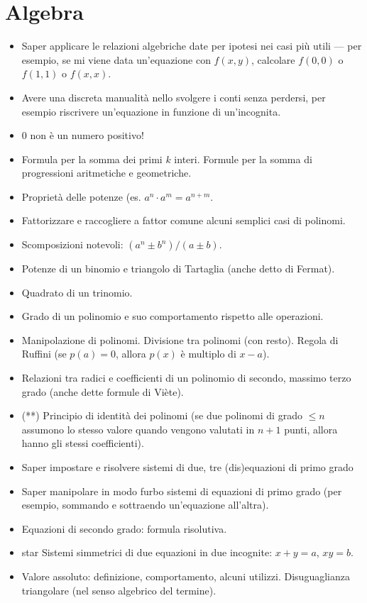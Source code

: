 \documentclass[a4paper,10pt]{paper}
\newcommand{\sstar}{(**)}
\begin{document}
\section{Algebra}
\begin{itemize}
 \item Saper applicare le relazioni algebriche date per ipotesi nei casi più utili --- per esempio, se mi viene data un'equazione con $f(x,y)$, calcolare $f(0,0)$ o $f(1,1)$ o $f(x,x)$.
 \item Avere una discreta manualità nello svolgere i conti senza perdersi, per esempio riscrivere un'equazione in funzione di un'incognita.
 \item $0$ non è un numero positivo!
 \item Formula per la somma dei primi $k$ interi. Formule per la somma di progressioni aritmetiche e geometriche.
 \item Proprietà delle potenze (es. $a^n\cdot a^m = a^{n+m}$.
 \item Fattorizzare e raccogliere a fattor comune alcuni semplici casi di polinomi.
 \item Scomposizioni notevoli: $(a^n \pm b^n) / (a\pm b)$.
 \item Potenze di un binomio e triangolo di Tartaglia (anche detto di Fermat).
 \item Quadrato di un trinomio.
 \item Grado di un polinomio e suo comportamento rispetto alle operazioni.
 \item Manipolazione di polinomi. Divisione tra polinomi (con resto). Regola di Ruffini (se $p(a)=0$, allora $p(x)$ è multiplo di $x-a$).
 \item Relazioni tra radici e coefficienti di un polinomio di secondo, massimo terzo grado (anche dette formule di Viète).
 \item \sstar{} Principio di identità dei polinomi (se due polinomi di grado $\leq n$ assumono lo stesso valore quando vengono valutati in $n+1$ punti, allora hanno gli stessi coefficienti).
 \item Saper impostare e risolvere sistemi di due, tre (dis)equazioni di primo grado
 \item Saper manipolare in modo furbo sistemi di equazioni di primo grado (per esempio, sommando e sottraendo un'equazione all'altra).
 \item Equazioni di secondo grado: formula risolutiva.
 \item star Sistemi simmetrici di due equazioni in due incognite: $x+y=a$, $xy=b$.
 \item Valore assoluto: definizione, comportamento, alcuni utilizzi. Disuguaglianza triangolare (nel senso algebrico del termine).

\end{itemize}
\end{document}
